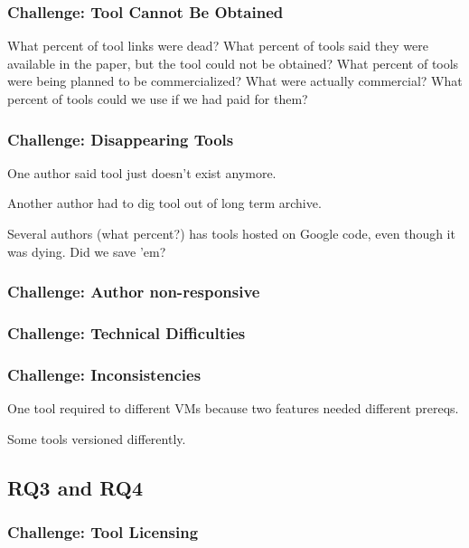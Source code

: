 \documentclass{sig-alternate-05-2015}
\begin{document}
\subsubsection{Challenge: Tool Cannot Be Obtained}

What percent of tool links were dead?
What percent of tools said they were available in the paper, but the tool could not be obtained?
What percent of tools were being planned to be commercialized? What were actually commercial?
What percent of tools could we use if we had paid for them?

\subsubsection{Challenge: Disappearing Tools}

One author said tool just doesn't exist anymore.

Another author had to dig tool out of long term archive.

Several authors (what percent?) has tools hosted on Google code, even though it was dying.
Did we save 'em?

\subsubsection{Challenge: Author non-responsive}


\subsubsection{Challenge: Technical Difficulties}

\subsubsection{Challenge: Inconsistencies}

One tool required to different VMs because two features needed different prereqs.

Some tools versioned differently.

\subsection{RQ3 and RQ4}


\subsubsection{Challenge: Tool Licensing}
\end{document}
